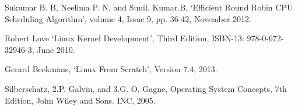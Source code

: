 Sukumar B. B, Neelima P. N, and Sunil. Kumar.B, `Efficient Round Robin CPU Scheduling Algorithm', volume 4, Issue 9, pp. 36-42, November 2012. 

Robert Love `Linux Kernel Development', Third Edition, ISBN-13: 978-0-672-32946-3, June 2010. 

Gerard Beekmans, `Linux From Scratch', Version 7.4, 2013. \ 

Silberschatz, 2.P. Galvin, and 3.G. O. Gagne, Operating System Concepts, 7th Edition, John Wiley and Sons. INC, 2005.





